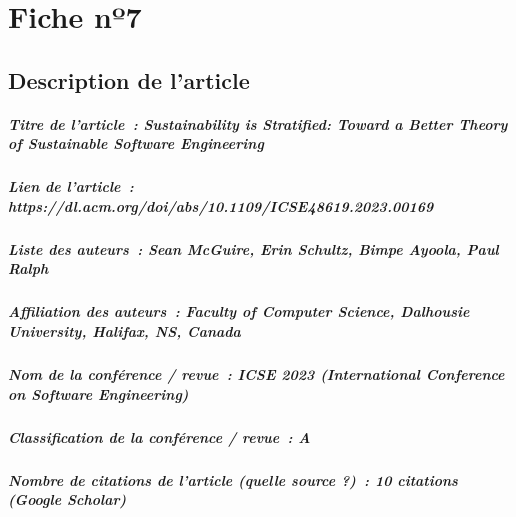 
\chapter{Fiche nº7} %
\label{app:Fiche7} %

\section{Description de l'article}

\paragraph{Titre de l'article~: \textnormal{Sustainability is Stratified: Toward a Better Theory of Sustainable Software Engineering}}
\paragraph{Lien de l'article~: \textnormal{https://dl.acm.org/doi/abs/10.1109/ICSE48619.2023.00169}}
\paragraph{Liste des auteurs~: \textnormal{Sean McGuire, Erin Schultz, Bimpe Ayoola, Paul Ralph}}
\paragraph{Affiliation des auteurs~: \textnormal{Faculty of Computer Science, Dalhousie University, Halifax, NS, Canada}}
\paragraph{Nom de la conférence / revue~: \textnormal{ICSE 2023 (International Conference on Software Engineering)}}
\paragraph{Classification de la conférence / revue~: \textnormal{A}}
\paragraph{Nombre de citations de l'article (quelle source ?)~: \textnormal{10 citations (Google Scholar)}}



